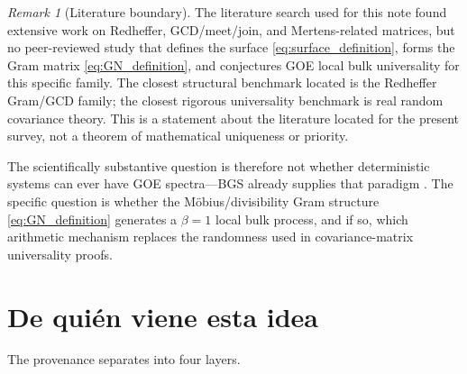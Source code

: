\documentclass[11pt]{amsart}
\numberwithin{equation}{section}
\theoremstyle{plain}
\theoremstyle{definition}
\theoremstyle{remark}
\newtheorem{remark}[theorem]{Remark}
\begin{document}
\begin{remark}[Literature boundary]
\label{rem:literature_boundary}
The literature search used for this note found extensive work on Redheffer, GCD/meet/join, and Mertens-related matrices, but no peer-reviewed study that defines the surface \eqref{eq:surface_definition}, forms the Gram matrix \eqref{eq:GN_definition}, and conjectures GOE local bulk universality for this specific family.  The closest structural benchmark located is the Redheffer Gram/GCD family; the closest rigorous universality benchmark is real random covariance theory.  This is a statement about the literature located for the present survey, not a theorem of mathematical uniqueness or priority.
\end{remark}

The scientifically substantive question is therefore not whether deterministic systems can ever have GOE spectra---BGS already supplies that paradigm \cite{BGS1984}.  The specific question is whether the M\"obius/divisibility Gram structure \eqref{eq:GN_definition} generates a $\beta=1$ local bulk process, and if so, which arithmetic mechanism replaces the randomness used in covariance-matrix universality proofs.

\section{De qui\'en viene esta idea}
\label{sec:provenance}

The provenance separates into four layers.
\end{document}
